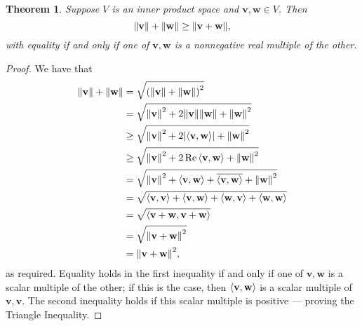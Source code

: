 \documentclass[11pt]{article}
\renewcommand{\vec}[1]{\mathbf{#1}}
\newcommand{\conjugate}[1]{\overline{#1}}
\newtheorem{theorem}{Theorem}
\begin{document}
\begin{theorem}
	Suppose $V$ is an inner product space and $\vec{v}, \vec{w} \in V$. Then
	\[
		\norm{\vec{v}} + \norm{\vec{w}} \ge \norm{\vec{v} + \vec{w}},
	\]
	with equality if and only if one of $\vec{v}, \vec{w}$ is a nonnegative real multiple of the other.
\end{theorem}
\begin{adjustwidth}{1cm}{}
	\begin{proof}
		We have that
		\begin{align*}
			\norm{\vec{v}} + \norm{\vec{w}} &= \sqrt{\left( \norm{\vec{v}} + \norm{\vec{w}} \right)^{2}} \\
			&= \sqrt{\norm{\vec{v}}^{2} + 2 \norm{\vec{v}} \norm{\vec{w}} + \norm{\vec{w}}^{2}} \\
			&\ge \sqrt{\norm{\vec{v}}^{2} + 2 \abs{\ev{\vec{v}, \vec{w}}} + \norm{\vec{w}}^{2}} \\
			&\ge \sqrt{\norm{\vec{v}}^{2} + 2 \Re \ev{\vec{v}, \vec{w}} + \norm{\vec{w}}^{2}} \\
			&= \sqrt{\norm{\vec{v}}^{2} + \ev{\vec{v}, \vec{w}} + \conjugate{\ev{\vec{v}, \vec{w}}} + \norm{\vec{w}}^{2}} \\
			&= \sqrt{\ev{\vec{v}, \vec{v}} + \ev{\vec{v}, \vec{w}} + \ev{\vec{w}, \vec{v}} + \ev{\vec{w}, \vec{w}}} \\
			&= \sqrt{\ev{\vec{v} + \vec{w}, \vec{v} + \vec{w}}} \\
			&= \sqrt{\norm{\vec{v} + \vec{w}}^{2}} \\
			&= \norm{\vec{v} + \vec{w}}^{2},
		\end{align*}
		as required. Equality holds in the first inequality if and only if one of $\vec{v}, \vec{w}$ is a scalar multiple of the other; if this is the case, then $\ev{\vec{v}, \vec{w}}$ is a scalar multiple of $\vec{v}, \vec{v}$. The second inequality holds if this scalar multiple is positive --- proving the Triangle Inequality.
	\end{proof}
\end{adjustwidth}
\end{document}
